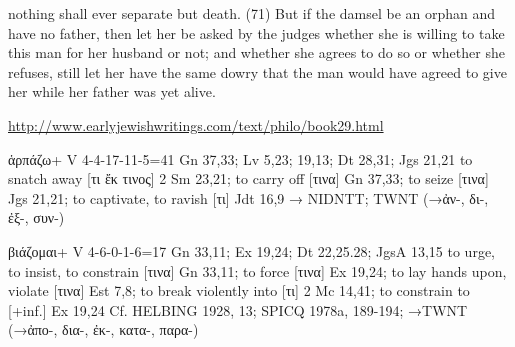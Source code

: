 \documentclass[11pt]{article}
\begin{document}
nothing shall ever separate but death. (71) But if the damsel be an orphan and have no father, then let her be asked by the judges whether she is willing to take this man for her husband or not; and whether she agrees to do so or whether she refuses, still let her have the same dowry that the man would have agreed to give her while her father was yet alive.

\url{http://www.earlyjewishwritings.com/text/philo/book29.html}


\begin{greek} ἁρπάζω+ V 4-4-17-11-5=41
Gn 37,33; Lv 5,23; 19,13; Dt 28,31; Jgs 21,21
to snatch away [τι ἔκ τινος] 2 Sm 23,21; to carry off [τινα] Gn 37,33; to seize [τινα] Jgs 21,21; to
captivate, to ravish [τι] Jdt 16,9
→ NIDNTT; TWNT
(→ἀν-, δι-, ἐξ-, συν-) 
\end{greek}

\begin{greek}
βιάζομαι+ V 4-6-0-1-6=17
Gn 33,11; Ex 19,24; Dt 22,25.28; JgsA 13,15
to urge, to insist, to constrain [τινα] Gn 33,11; to force [τινα] Ex 19,24; to lay hands upon, violate [τινα]
Est 7,8; to break violently into [τι] 2 Mc 14,41; to constrain to [+inf.] Ex 19,24
Cf. HELBING 1928, 13; SPICQ 1978a, 189-194; →TWNT
(→ἀπο-, δια-, ἐκ-, κατα-, παρα-) 
\end{greek}
\end{document}
